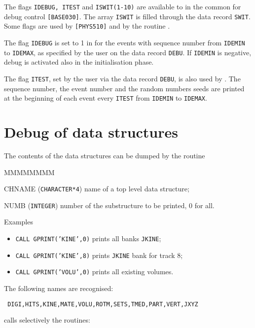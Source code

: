   
The flags {\tt IDEBUG, ITEST} and {\tt ISWIT(1-10)} are available to
in the
common  for debug control {\tt [BASE030]}.
The array {\tt ISWIT} is filled through the data record
{\tt SWIT}.
Some flags are used by  {\tt [PHYS510]} and
by the routine .

The flag {\tt IDEBUG} is set to 1 in  for the events
with sequence number from {\tt IDEMIN} to {\tt IDEMAX}, as specified by
the user on the data record {\tt DEBU}.
If {\tt IDEMIN} is negative, debug is
activated also in the initialisation phase.

The flag {\tt ITEST}, set by the user via the data
record {\tt DEBU}, is also used by .
The sequence number, the event number and the random numbers seeds are
printed at the beginning of each event every {\tt ITEST} from
{\tt IDEMIN} to {\tt IDEMAX}.

\section{Debug of data structures}
The contents of the data structures can be dumped by the routine
\begin{DLtt}{MMMMMMMM}
\item[CHNAME] ({\tt CHARACTER*4}) name of a top level data structure;
\item[NUMB] ({\tt INTEGER}) number of the substructure to be printed, 0 for all.
\end{DLtt}

Examples
\begin{itemize}
\item{\tt CALL GPRINT('KINE',0)} prints all banks {\tt JKINE};
\item{\tt CALL GPRINT('KINE',8)} prints {\tt JKINE} bank for track 8;
\item{\tt CALL GPRINT('VOLU',0)} prints all existing volumes.
\end{itemize}
The following names are recognised:
\begin{center}\tt
DIGI,HITS,KINE,MATE,VOLU,ROTM,SETS,TMED,PART,VERT,JXYZ
\end{center}
 calls selectively the routines:

